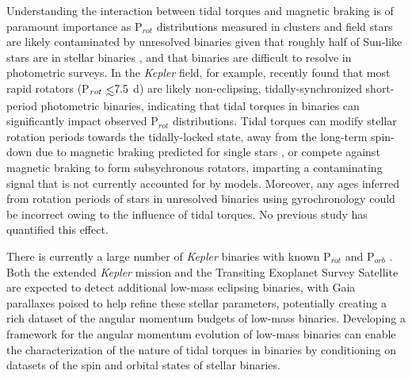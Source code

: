 \documentclass[twocolumn]{aastex61}
\def\lsim{~\rlap{$<$}{\lower 1.0ex\hbox{$\sim$}}}
\newcommand{\kepler}[0]{\textit{Kepler}\xspace}
\begin{document}
 
Understanding the interaction between tidal torques and magnetic braking is of paramount importance as P$_{rot}$ distributions measured in clusters \citep[e.g. Praesepe, ][]{Agueros2011,Douglas2017} and field stars \citep[e.g. \kepler, ][]{Reinhold2013,McQuillan2014} are likely contaminated by unresolved binaries given that roughly half of Sun-like stars are in stellar binaries \citep{Raghavan2010,Duchene2013}, and that binaries are difficult to resolve in photometric surveys. In the \kepler field, for example, \citet{Simonian2018} recently found that most rapid rotators (P$_{rot} \lsim 7.5$ d) are likely non-eclipsing, tidally-synchronized short-period photometric binaries, indicating that tidal torques in binaries can significantly impact observed P$_{rot}$ distributions.  Tidal torques can modify stellar rotation periods towards the tidally-locked state, away from the long-term spin-down due to magnetic braking predicted for single stars \citep{Dunn1961,Skumanich1972,Barnes2003}, or compete against magnetic braking to form subsychronous rotators, imparting a contaminating signal that is not currently accounted for by models. Moreover, any ages inferred from rotation periods of stars in unresolved binaries using gyrochronology could be incorrect owing to the influence of tidal torques. No previous study has quantified this effect. 

There is currently a large number of \kepler binaries with known P$_{rot}$ and P$_{orb}$ \citep[e.g.][]{Lurie2017}. Both the extended \kepler mission \citep[K2,][]{Howell2014} and the Transiting Exoplanet Survey Satellite \citep[TESS, ][]{Ricker2014,Sullivan2015} are expected to detect additional low-mass eclipsing binaries, with Gaia parallaxes \citep{Gaia2016} poised to help refine these stellar parameters, potentially creating a rich dataset of the angular momentum budgets of low-mass binaries. Developing a framework for the angular momentum evolution of low-mass binaries can enable the characterization of the nature of tidal torques in binaries by conditioning on datasets of the spin and orbital states of stellar binaries.
\end{document}
